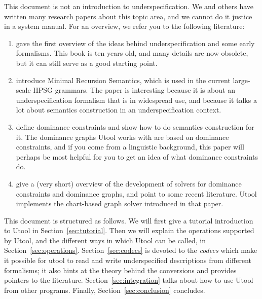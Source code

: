 This document is not an introduction to underspecification. We and
others have written many research papers about this topic area, and we
cannot do it justice in a system manual. For an overview, we refer you
to the following literature:
\begin{enumerate}
\item {} gave the first overview of the ideas
behind underspecification and some early formalisms. This book is ten
years old, and many details are now obsolete, but it can still serve
as a good starting point.
\item {} introduce Minimal Recursion Semantics, which
is used in the current large-scale HPSG grammars. The paper is
interesting because it is about an underspecification formalism that
is in widespread use, and because it talks a lot about semantics
construction in an underspecification context.
\item {} define dominance constraints and show how to do
semantics construction for it. The dominance graphs Utool works with
are based on dominance constraints, and if you come from a linguistic
background, this paper will perhaps be most helpful for you to get an
idea of what dominance constraints do.
\item {} give a (very short) overview of the
development of solvers for dominance constraints and dominance graphs,
and point to some recent literature. Utool implements the chart-based
graph solver introduced in that paper.
\end{enumerate}


This document is structured as follows. We will first give a tutorial
introduction to Utool in Section~\ref{sec:tutorial}. Then we will
explain the operations supported by Utool, and the different ways in
which Utool can be called, in
Section~\ref{sec:operations}. Section~\ref{sec:codecs} is devoted to
the \emph{codecs} which make it possible for utool to read and write
underspecified descriptions from different formalisms; it also hints
at the theory behind the conversions and provides pointers to the
literature. Section~\ref{sec:integration} talks about how to use Utool
from other programs. Finally, Section~\ref{sec:conclusion} concludes.

